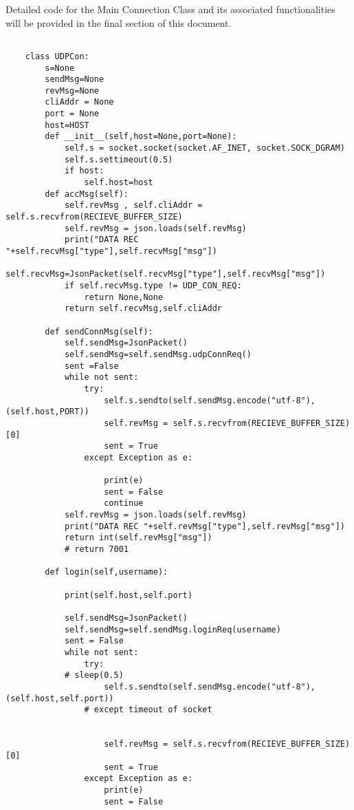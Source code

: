 Detailed code for the Main Connection Class and its associated functionalities will be provided in the final section of this document.
\begin{lstlisting}[style=pythonstyle]

    class UDPCon:
        s=None
        sendMsg=None
        revMsg=None
        cliAddr = None
        port = None
        host=HOST
        def __init__(self,host=None,port=None):
            self.s = socket.socket(socket.AF_INET, socket.SOCK_DGRAM)
            self.s.settimeout(0.5)
            if host:
                self.host=host
        def accMsg(self):
            self.revMsg , self.cliAddr = self.s.recvfrom(RECIEVE_BUFFER_SIZE)
            self.revMsg = json.loads(self.revMsg)
            print("DATA REC "+self.recvMsg["type"],self.recvMsg["msg"])
            self.recvMsg=JsonPacket(self.recvMsg["type"],self.recvMsg["msg"])
            if self.recvMsg.type != UDP_CON_REQ:
                return None,None
            return self.recvMsg,self.cliAddr
    
        def sendConnMsg(self):
            self.sendMsg=JsonPacket()
            self.sendMsg=self.sendMsg.udpConnReq()
            sent =False
            while not sent:
                try:
                    self.s.sendto(self.sendMsg.encode("utf-8"), (self.host,PORT))
                    self.revMsg = self.s.recvfrom(RECIEVE_BUFFER_SIZE)[0]
                    sent = True
                except Exception as e:
    
                    print(e)
                    sent = False
                    continue
            self.revMsg = json.loads(self.revMsg)
            print("DATA REC "+self.revMsg["type"],self.revMsg["msg"])
            return int(self.revMsg["msg"])
            # return 7001
    
        def login(self,username):
            
            print(self.host,self.port)
    
            self.sendMsg=JsonPacket()
            self.sendMsg=self.sendMsg.loginReq(username)
            sent = False
            while not sent:
                try:
            # sleep(0.5)
                    self.s.sendto(self.sendMsg.encode("utf-8"), (self.host,self.port))
                # except timeout of socket
                    
            
                    self.revMsg = self.s.recvfrom(RECIEVE_BUFFER_SIZE)[0]
                    sent = True
                except Exception as e:
                    print(e)
                    sent = False
    

\end{lstlisting}
